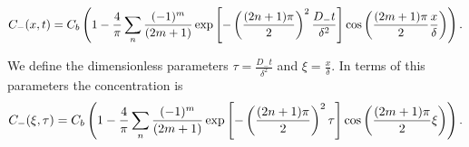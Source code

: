 \begin{align}
	C_-(x,t) = C_b\left({1-\frac{4}{\pi} \sum_n \frac{(-1)^m}{(2m+1)}\exp\left[{-\left({\frac{(2n+1)\pi}{2}}\right)^2\frac{D_- t}{\delta^2}}\right]\cos\left({\frac{(2m+1)\pi}{2} \frac{x}{\delta}}\right)}\right).
	\label{eq:solution-diffusion}
\end{align}


We define the dimensionless parameters $\tau = \frac{D_- t}{\delta^2}$ and $\xi = \frac{x}{\delta}$. In terms of this parameters the concentration is
\begin{align}
	C_-(\xi,\tau) = C_b\left({1-\frac{4}{\pi} \sum_n \frac{(-1)^m}{(2m+1)}\exp\left[{-\left({\frac{(2n+1)\pi}{2}}\right)^2\tau}\right]\cos\left({\frac{(2m+1)\pi}{2} \xi}\right)}\right).
	\label{eq:solution-diffusion}
\end{align}



